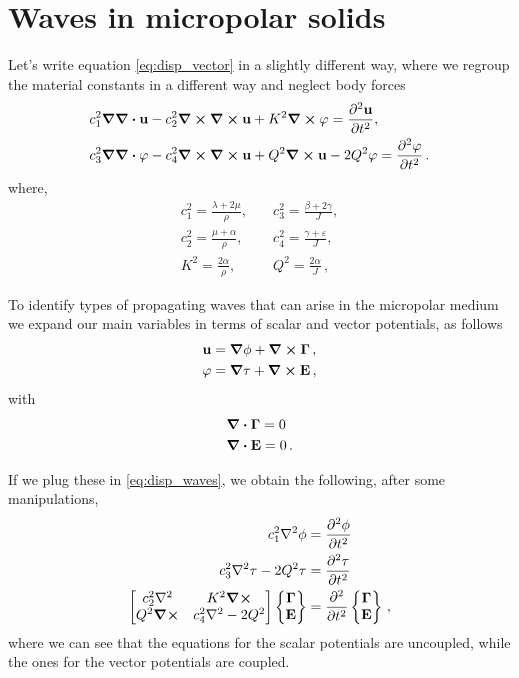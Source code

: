\documentclass[12pt]{article}
\begin{document}
\section{Waves in micropolar solids}
Let's write equation \eqref{eq:disp_vector} in a slightly different way, where we regroup the material constants in a different way and neglect body forces
\begin{subequations}
  \begin{align}\label{eq:disp_waves}
    & c_1^2 \grad\div\vb{u} - c_2^2\curl\curl\vb{u} + K^2 \curl\vb{\varphi} =  \pdv[2]{\vb{u}}{t}, \\
    & c_3^2 \grad\div\vb{\varphi} - c_4^2 \curl\curl\vb{u} +  Q^2 \curl\vb{u} - 2Q^2 \vb{\varphi} = \pdv[2]{\vb{\varphi}}{t}\, .
  \end{align}
\end{subequations}
where,
\begin{equation*}
\begin{split}
c_1^2 = \frac{\lambda +2\mu}{\rho},\quad &c_3^2 =\frac{\beta +2\gamma}{J},\\
c_2^2 = \frac{\mu +\alpha}{\rho},\quad &c_4^2 =\frac{\gamma + \varepsilon}{J},\\
K^2= \frac{2\alpha}{\rho},\quad &Q^2 =\frac{2\alpha}{J} \, ,
\end{split}
\end{equation*}


To identify types of propagating waves that can arise in the micropolar medium we expand our main variables in terms of scalar and vector potentials, as follows
\begin{align*}
\vb{u} &= \grad \phi + \curl\vb{\Gamma}\, ,\\
\vb{\varphi} &= \grad \tau + \curl\vb{E}\, ,
\end{align*}
with
\begin{align*}
&\div\vb{\Gamma} = 0\\
&\div\vb{E} = 0\, .
\end{align*}

If we plug these in \eqref{eq:disp_waves}, we obtain the following, after some manipulations,
\begin{subequations}
  \begin{align}\label{eq:disp_waves}
    c_1^2 \laplacian\phi &= \pdv[2]{\phi}{t}\\
    c_3^2 \laplacian\tau - 2Q^2\tau &= \pdv[2]{\tau}{t}\\
    \begin{bmatrix}
      c_2^2\laplacian &K^2\curl\\
      Q^2\curl &c_4^2\laplacian - 2Q^2
    \end{bmatrix}
    \begin{Bmatrix} \vb{\Gamma}\\ \vb{E}\end{Bmatrix} &=
    \pdv[2]{t} \begin{Bmatrix} \vb{\Gamma}\\ \vb{E}\end{Bmatrix}\, ,
  \end{align}
\end{subequations}
where we can see that the equations for the scalar potentials are uncoupled, while the ones
for the vector potentials are coupled.
\end{document}

